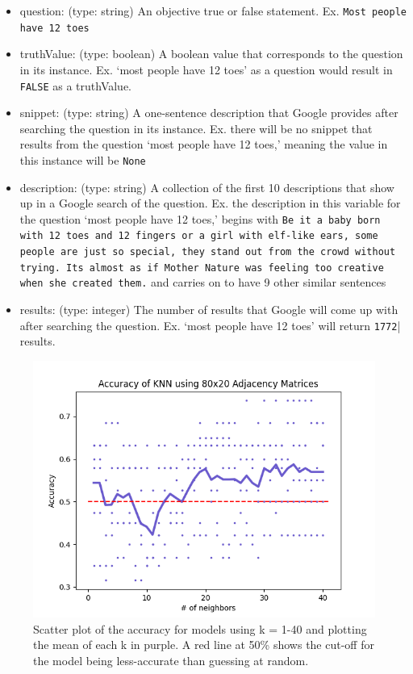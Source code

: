 \documentclass[]{article}
\begin{document}
		\begin{itemize}
			\item question: (type: string) An objective true or false statement. Ex. \texttt{Most people have 12 toes}
				
			\item truthValue: (type: boolean) A boolean value that corresponds to the question in its instance. Ex. `most people have 12 toes' as a question would result in \texttt{FALSE} as a truthValue.
				
			\item snippet: (type: string) A one-sentence description that Google provides after searching the question in its instance. Ex. there will be no snippet that results from the question `most people have 12 toes,' meaning the value in this instance will be \texttt{None}
				
			\item description: (type: string) A collection of the first 10 descriptions that show up in a Google search of the question. Ex. the description in this variable for the question `most people have 12 toes,' begins with \texttt{Be it a baby born with 12 toes and 12 fingers or a girl with elf-like ears, some people are just so special, they stand out from the crowd without trying. Its almost as if Mother Nature was feeling too creative when she created them.} and carries on to have 9 other similar sentences
				
			\item results: (type: integer) The number of results that Google will come up with after searching the question. Ex. `most people have 12 toes' will return \texttt{1772}| results.
		\end{itemize}
		
		\begin{figure}
			\centering
			\includegraphics[width=0.8\linewidth]{accuracies-line.png}
			\caption{Scatter plot of the accuracy for models using k = 1-40 and plotting the mean of each k in purple. A red line at 50\% shows the cut-off for the model being less-accurate than guessing at random.}
			\label{fig:scatter}
		\end{figure}
		
\end{document}
